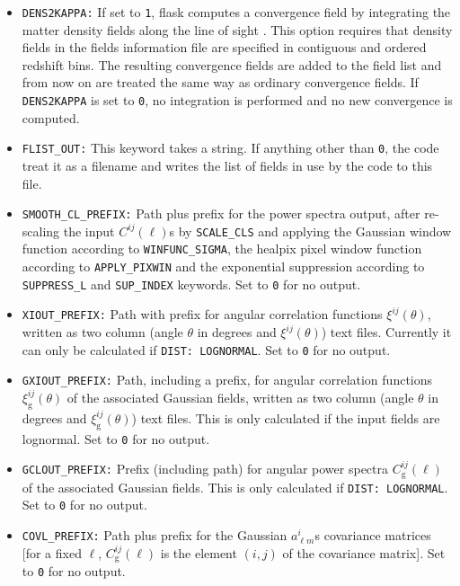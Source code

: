 \documentclass[12pt]{book} %
\newcommand{\nv}[1]{\mathrm{#1}}                 %
\begin{document}
\begin{itemize}
\item {\tt DENS2KAPPA:} If set to {\tt 1}, {\sc flask} computes a convergence field by integrating 
  the matter density fields along the line of sight \citep[see][for details]{Xavier16mn}. This 
  option requires that density fields in the fields information file are specified in contiguous 
  and ordered redshift bins. The resulting convergence fields are added to the field list and from 
  now on are treated the same way as ordinary convergence fields. If {\tt DENS2KAPPA} is set to {\tt 0}, 
  no integration is performed and no new convergence is computed. 

\item {\tt FLIST\_OUT:} This keyword takes a string. If anything other than {\tt 0}, the code 
  treat it as a filename and writes the list of fields in use by the code to this file. 

\item {\tt SMOOTH\_CL\_PREFIX:} Path plus prefix for the power spectra output, after re-scaling 
  the input $C^{ij}(\ell)$s by {\tt SCALE\_CLS} and applying the Gaussian window function according to 
  {\tt WINFUNC\_SIGMA}, the {\sc healpix} pixel window function according to {\tt APPLY\_PIXWIN} 
  and the exponential suppression according to {\tt SUPPRESS\_L} and {\tt SUP\_INDEX} 
  keywords. Set to {\tt 0} for no output.

\item {\tt XIOUT\_PREFIX:} Path with prefix for angular correlation functions $\xi^{ij}(\theta)$, 
  written as two column (angle $\theta$ in degrees and $\xi^{ij}(\theta)$) text files. 
  Currently it can only be calculated if {\tt DIST: LOGNORMAL}. Set to {\tt 0} for no output.

\item {\tt GXIOUT\_PREFIX:} Path, including a prefix, for angular correlation functions 
  $\xi^{ij}_{\nv{g}}(\theta)$ of the associated Gaussian fields, written as two column 
  (angle $\theta$ in degrees and $\xi^{ij}_{\nv{g}}(\theta)$) text files. This is only calculated if the 
  input fields are lognormal. Set to {\tt 0} for no output.

\item {\tt GCLOUT\_PREFIX:} Prefix (including path) for angular power spectra $C_{\nv{g}}^{ij}(\ell)$ 
  of the associated Gaussian fields. This is only calculated if {\tt DIST: LOGNORMAL}. 
  Set to {\tt 0} for no output.

\item {\tt COVL\_PREFIX:} Path plus prefix for the Gaussian $a^{i}_{\ell m}$s covariance matrices 
  [for a fixed $\ell$, $C_{\nv{g}}^{ij}(\ell)$ is the element $(i,j)$ of the covariance matrix]. 
  Set to {\tt 0} for no output.


\end{itemize}
\end{document}
